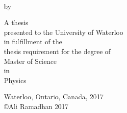 \begin{titlepage}
    \begin{center}
      \large  
      
      \hfill
      \vfill
      
      \begin{spacing}{1.00}
        {\LARGE \myTitle \\ \bigskip}
      \end{spacing}

      
      by \\ \bigskip
      
      {\Large \myName}
      
      \vfill
      
      A thesis \\
      presented to the University of Waterloo \\
      in fulfillment of the \\
      thesis requirement for the degree of \\
      Master of Science \\
      in \\
      Physics
      
      \vfill
      
      Waterloo, Ontario, Canada, 2017 \\
      \vspace{1 em}
      \copyright Ali Ramadhan 2017
      
      \vfill
      
    \end{center}
\end{titlepage}  
